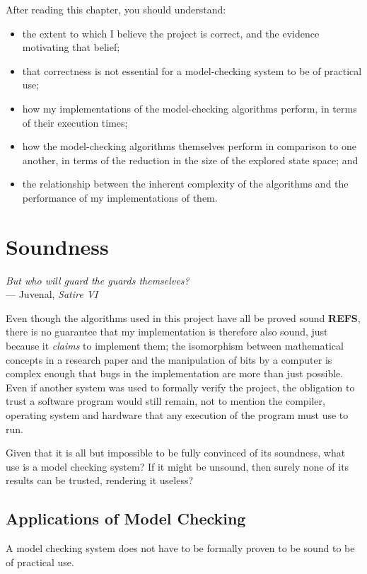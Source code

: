 \documentclass[12pt,a4paper,twoside,openright]{report}
\newenvironment{understandinglist}
	{\begin{itemize} \itemsep 0em}{\end{itemize}}
\begin{document}
After reading this chapter,
you should understand:
\begin{understandinglist}
	\item the extent to which I believe
	the project is correct, and the evidence
	motivating that belief;
	\item that correctness is not
	essential for a model-checking
	system to be of practical use;
	\item how my implementations
	of the model-checking algorithms
	perform, in terms of their
	execution times;
	\item how the model-checking
	algorithms themselves perform
	in comparison to one another,
	in terms of the reduction in the
	size of the explored state space; and
	\item the relationship between the
	inherent complexity of the
	algorithms and the performance of
	my implementations of them.
\end{understandinglist}

\section{Soundness}

\begin{center}
	\textit{But who will guard the guards themselves?} \\
	\qquad\qquad\qquad --- Juvenal, \textit{Satire VI}
\end{center}

Even though the algorithms
used in this project have all be proved sound \textbf{REFS},
there is no guarantee that my implementation
is therefore also sound, just because it
\emph{claims} to implement them; the isomorphism
between mathematical concepts in a research paper
and the manipulation of bits by a computer
is complex enough that bugs in the
implementation are more than just possible.
Even if another system was used to formally verify
the project, the obligation to trust
a software program would still remain,
not to mention the compiler, operating
system and hardware that any execution
of the program must use to run.

Given that it is all but impossible to
be fully convinced of its soundness,
what use is a model checking
system? If it might be unsound, then surely
none of its results can be trusted,
rendering it useless?

\subsection{Applications of Model Checking}
A model checking system does not have to be
formally proven to be sound to be of practical use.
\end{document}
